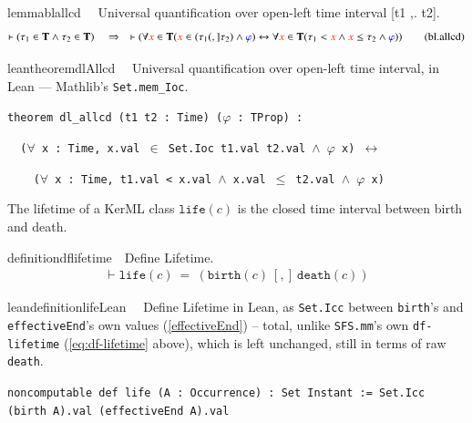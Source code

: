\begin{restatable}{lemma}{blallcd}~~ Universal quantification over open-left
time interval [t1 ,. t2].
\begin{align}
\vdash ( \tau_1 \in \mathbf{T} \wedge \tau_2 \in \mathbf{T}
    )\quad\Rightarrow\quad \vdash ( \forall \msc{x} \in \mathbf{T} ( \msc{x}
    \in ( \tau_1 (,] \tau_2 ) \wedge \mw{\varphi} ) \leftrightarrow \forall
    \msc{x} \in \mathbf{T} ( \tau_1 < \msc{x} \wedge \msc{x} \le \tau_2 \wedge
    \mw{\varphi} ) )\label{eq:bl.allcd}\tag{bl.allcd}
\end{align}
\end{restatable}

\begin{restatable}{leantheorem}{dlAllcd}~~ Universal quantification over open-left time
interval, in Lean --- Mathlib's \texttt{Set.mem\_Ioc}.

\texttt{\textcolor{leancolor}{theorem} \textcolor{leanyellow}{dl\_allcd} (t1 t2 : Time) ($\varphi$ : TProp) :}

\texttt{~~($\forall$ x : Time, x.val $\in$ Set.Ioc t1.val t2.val $\wedge$ $\varphi$ x) $\leftrightarrow$}

\texttt{~~~~($\forall$ x : Time, t1.val < x.val $\wedge$ x.val $\le$ t2.val $\wedge$ $\varphi$ x)}
\label{dl_allcd}
\end{restatable}

\pn The lifetime of a KerML class  $\texttt{life}(c)$ is the closed time interval between birth and death.

\begin{restatable}{definition}{dflifetime}~~Define Lifetime.
\begin{align}
\vdash \texttt{life}(c)~=~ (\texttt{birth}(c)~[,]~\texttt{death}(c))
\label{eq:df-lifetime}\tag{df-lifetime}
\end{align}
\end{restatable}

\begin{restatable}{leandefinition}{lifeLean}~~ Define Lifetime in Lean, as \texttt{Set.Icc}
between \texttt{birth}'s and \texttt{effectiveEnd}'s own values (\ref{effectiveEnd}) -- total, unlike
\texttt{SFS.mm}'s own \texttt{df-lifetime} (\eqref{eq:df-lifetime} above), which is left unchanged, still
in terms of raw \texttt{death}.

\texttt{\textcolor{leancolor}{noncomputable def} \textcolor{leanyellow}{life} (A : Occurrence) : Set Instant := Set.Icc (birth A).val (effectiveEnd A).val}
\label{life}
\end{restatable}

